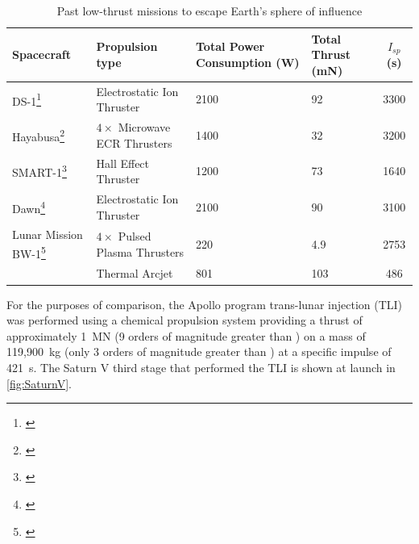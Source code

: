 \begin{table}[ht]
  \caption{Past low-thrust missions to escape Earth's sphere of influence}
  \label{tab:Past-low-thrust-missions}
    \begin{center}
    \begin{minipage}{\textwidth}
    \begin{tabular}{C{0.2\textwidth} C{0.25\textwidth} C{0.2\textwidth} C{0.1\textwidth} c}\toprule
      Spacecraft & Propulsion type & Total Power \linebreak Consumption \linebreak (W) & Total Thrust \linebreak (mN) & $I_{sp}$ (s)\\\midrule
      DS-1\footnote{\textcite{web_DS-1}} & Electrostatic Ion Thruster & 2100 & 92 & 3300\\
      Hayabusa\footnote{\textcite{web_Hayabusa}} & $4\times$ Microwave ECR Thrusters & 1400 & 32 & 3200\\
      SMART-1\footnote{\textcite{web_SMART-1}} & Hall Effect Thruster & 1200 & 73 & 1640\\
      Dawn\footnote{\textcite{web_Dawn}} & Electrostatic Ion Thruster & 2100 & 90 & 3100\\\midrule
      Lunar Mission BW-1\footnote{\textcite{web_BW-1}} & $4\times$ Pulsed Plasma Thrusters & 220 & 4.9 & 2753\\
      & Thermal Arcjet & 801 & 103 & 486 \\\bottomrule
    \end{tabular}
    \end{minipage}
    \end{center}
\end{table}

For the purposes of comparison, the Apollo program trans-lunar injection (TLI) was performed using a chemical propulsion system providing a thrust of approximately 1~MN (9 orders of magnitude greater than \BW) on a mass of 119,900~kg (only 3 orders of magnitude greater than \BW) at a specific impulse of 421~s. The Saturn V third stage that performed the TLI is shown at launch in \autoref{fig:SaturnV}.

